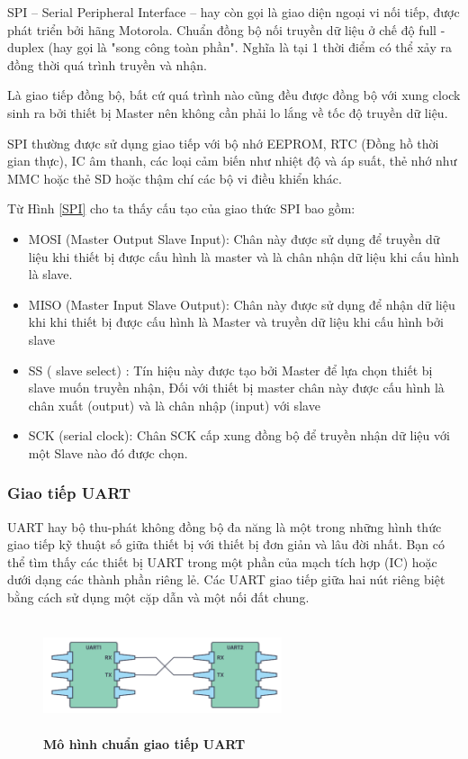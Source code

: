 \documentclass{article} %
\begin{document}
	SPI – Serial Peripheral Interface – hay còn gọi là giao diện ngoại vi nối tiếp, được phát triển bởi hãng Motorola. Chuẩn đồng bộ nối truyền dữ liệu ở chế độ full - duplex (hay gọi là "song công toàn phần". Nghĩa là tại 1 thời điểm có thể xảy ra đồng thời quá trình truyền và nhận. 
	
	Là giao tiếp đồng bộ, bất cứ quá trình nào cũng đều được đồng bộ với xung clock sinh ra bởi thiết bị Master nên không cần phải lo lắng về tốc độ truyền dữ liệu.
	
	SPI thường được sử dụng giao tiếp với bộ nhớ EEPROM, RTC (Đồng hồ thời gian thực), IC âm thanh, các loại cảm biến như nhiệt độ và áp suất, thẻ nhớ như MMC hoặc thẻ SD hoặc thậm chí các bộ vi điều khiển khác.
	
	
	Từ Hình \ref{SPI} cho ta thấy cấu tạo của giao thức SPI bao gồm:
	
	\begin{itemize}
		\item MOSI (Master Output Slave Input): Chân này được sử dụng để truyền dữ liệu khi thiết bị được cấu hình là master và là chân nhận dữ liệu khi cấu hình là slave.
		\item MISO (Master Input Slave Output): Chân này được sử dụng để nhận dữ liệu khi khi thiết bị được cấu hình là Master và truyền dữ liệu khi cấu hình bởi slave
		\item SS ( slave select) : Tín hiệu này được tạo bởi Master để lựa chọn thiết bị slave muốn truyền nhận, Đối với thiết bị master chân này được cấu hình là chân xuất (output) và là chân nhập (input) với slave
		\item SCK (serial clock): Chân SCK cấp xung đồng bộ để truyền nhận dữ liệu với một Slave nào đó được chọn.
	\end{itemize}
	
	\subsubsection{Giao tiếp UART}
	UART hay bộ thu-phát không đồng bộ đa năng là một trong những hình thức giao tiếp kỹ thuật số giữa thiết bị với thiết bị đơn giản và lâu đời nhất. Bạn có thể tìm thấy các thiết bị UART trong một phần của mạch tích hợp (IC) hoặc dưới dạng các thành phần riêng lẻ. Các UART giao tiếp giữa hai nút riêng biệt bằng cách sử dụng một cặp dẫn và một nối đất chung.
	\begin{figure}[!ht]
		\centering
		\includegraphics[width=7cm,height=3.3cm]{Images/UART.png}
		\caption[Mô hình chuẩn giao tiếp UART\cite{UART}]{\bfseries \fontsize{12pt}{0pt}\selectfont Mô hình chuẩn giao tiếp UART\cite{UART}}
		\label{uart}
	\end{figure}
	
\end{document}
